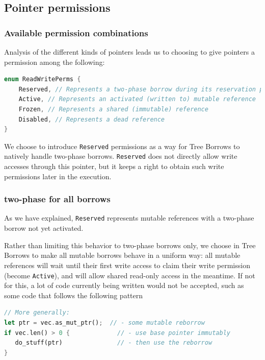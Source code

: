 \documentclass[a4paper,11pt]{article}
\theoremstyle{plain}
\theoremstyle{definition}
\theoremstyle{remark}
\newcommand{\tperm}[1]{\texttt{#1}}
\begin{document}
\subsection{Pointer permissions}

\subsubsection{Available permission combinations}

Analysis of the different kinds of pointers leads us to choosing to give pointers
a permission among the following:
\begin{lstlisting}[language=rust]
enum ReadWritePerms {
    Reserved, // Represents a two-phase borrow during its reservation phase
    Active, // Represents an activated (written to) mutable reference
    Frozen, // Represents a shared (immutable) reference
    Disabled, // Represents a dead reference
}
\end{lstlisting}

We choose to introduce \tperm{Reserved} permissions as a way for Tree Borrows to
natively handle two-phase borrows. \tperm{Reserved} does not directly allow write
accesses through this pointer, but it keeps a right to obtain such
write permissions later in the execution.

\subsubsection{two-phase for all borrows}

As we have explained, \tperm{Reserved} represents mutable references with
a two-phase borrow not yet activated.

Rather than limiting this behavior to two-phase borrows only, we choose in Tree
Borrows to make all mutable borrows behave in a uniform way: all mutable references
will wait until their first write access to claim their write permission (become \tperm{Active}),
and will allow shared read-only access in the meantime. If not for this, a lot
of code currently being written would not be accepted, such as some code that
follows the following pattern
\begin{lstlisting}[language=rust]
                               // More generally:
let ptr = vec.as_mut_ptr();  // - some mutable reborrow
if vec.len() > 0 {             // - use base pointer immutably
   do_stuff(ptr)               // - then use the reborrow
}
\end{lstlisting}
\end{document}
